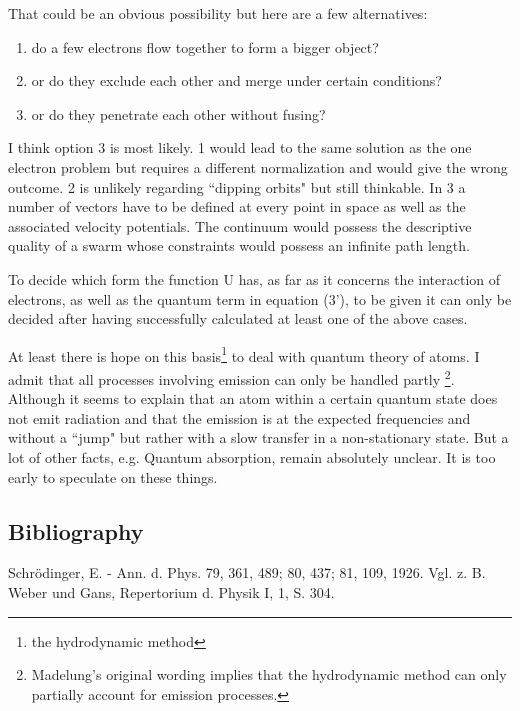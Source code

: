 That could be an obvious possibility but here are a few alternatives:
\begin{enumerate}
\item do a few electrons flow together to form a bigger object?
\item or do they exclude each other and merge under certain conditions?
\item or do they penetrate each other without fusing?
\end{enumerate}

I think option 3 is most likely. 1 would lead to the same solution as the one electron problem but requires a different normalization and would give the wrong outcome. 2 is unlikely regarding ``dipping orbits" but still thinkable. In 3 a number of vectors have to be defined at every point in space as well as the associated velocity potentials. The continuum would possess the descriptive quality of a swarm whose constraints would possess an infinite path length.

To decide which form the function U has, as far as it concerns the interaction of electrons, as well as the quantum term in equation (3'), to be given it can only be decided after having successfully calculated at least one of the above cases.

At least there is hope on this basis\footnote{the hydrodynamic method} to deal with quantum theory of atoms. I admit that all processes involving emission can only be handled partly \footnote{Madelung's original wording implies that the hydrodynamic method can only partially account for emission processes.}. Although it seems to explain that an atom within a certain quantum state does not emit radiation and that the emission is at the expected frequencies and without a ``jump" but rather with a slow transfer in a non-stationary state. But a lot of other facts, e.g. Quantum absorption, remain absolutely unclear. It is too early to speculate on these things.


%
%
\subsection*{Bibliography}
Schr\"odinger, E. - Ann. d. Phys. 79, 361, 489; 80, 437; 81, 109, 1926.
Vgl. z. B. Weber und Gans, Repertorium d. Physik I, 1, S. 304.

